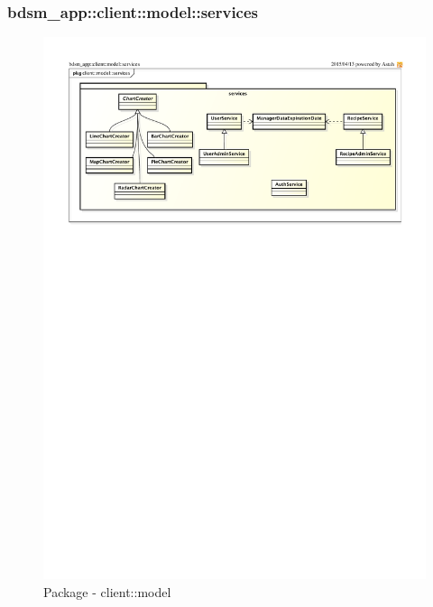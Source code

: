 %
%

%

\subsubsection{bdsm\_app::client::model::services} %
\label{ssub:bdsm_app_client_model_services}
\begin{figure}[htbp]
	\centering
	\centerline{\includegraphics[scale=1.00]{./images/client_model_services.pdf}}
	\caption{Package - client::model}
\end{figure}

